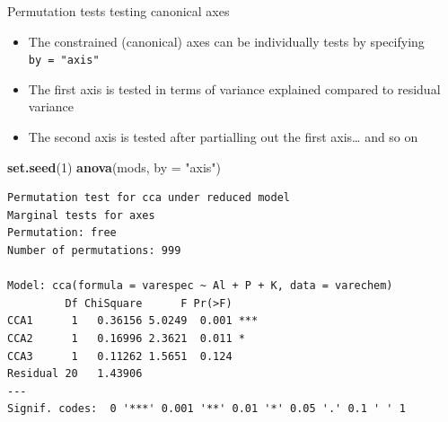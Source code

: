 \documentclass[10pt,ignorenonframetext,compress, aspectratio=169]{beamer}
\newenvironment{Shaded}{\begin{snugshade}}{\end{snugshade}}
\newcommand{\KeywordTok}[1]{\textcolor[rgb]{0.13,0.29,0.53}{\textbf{{#1}}}}
\newcommand{\DataTypeTok}[1]{\textcolor[rgb]{0.13,0.29,0.53}{{#1}}}
\newcommand{\DecValTok}[1]{\textcolor[rgb]{0.00,0.00,0.81}{{#1}}}
\newcommand{\StringTok}[1]{\textcolor[rgb]{0.31,0.60,0.02}{{#1}}}
\newcommand{\NormalTok}[1]{{#1}}
\begin{document}
\begin{frame}[fragile]{Permutation tests \textbar{} testing canonical
axes}

\begin{itemize}
\itemsep1pt\parskip0pt
\item
  The constrained (canonical) axes can be individually tests by
  specifying \texttt{by\ =\ "axis"}
\item
  The first axis is tested in terms of variance explained compared to
  residual variance
\item
  The second axis is tested after partialling out the first axis\ldots{}
  and so on
\end{itemize}

\tiny

\begin{Shaded}
\begin{Highlighting}[]
\KeywordTok{set.seed}\NormalTok{(}\DecValTok{1}\NormalTok{)}
\KeywordTok{anova}\NormalTok{(mods, }\DataTypeTok{by =} \StringTok{"axis"}\NormalTok{)}
\end{Highlighting}
\end{Shaded}

\begin{verbatim}
Permutation test for cca under reduced model
Marginal tests for axes
Permutation: free
Number of permutations: 999

Model: cca(formula = varespec ~ Al + P + K, data = varechem)
         Df ChiSquare      F Pr(>F)    
CCA1      1   0.36156 5.0249  0.001 ***
CCA2      1   0.16996 2.3621  0.011 *  
CCA3      1   0.11262 1.5651  0.124    
Residual 20   1.43906                  
---
Signif. codes:  0 '***' 0.001 '**' 0.01 '*' 0.05 '.' 0.1 ' ' 1
\end{verbatim}

\normalsize

\end{frame}
\end{document}
